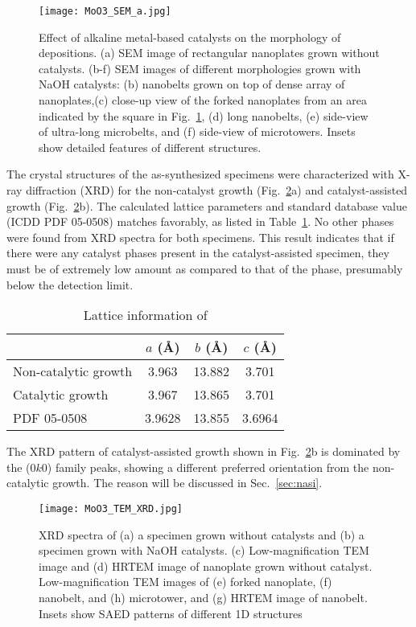 \begin{figure}[htb]
\centering
\texttt{[image: MoO3\_SEM\_a.jpg]}
\caption[SEM imaging on  catalytic growth]{Effect of alkaline metal-based catalysts on the morphology of  depositions. (a) SEM image of rectangular nanoplates grown without catalysts. (b-f) SEM images of different morphologies grown with NaOH catalysts: (b) nanobelts grown on top of dense array of nanoplates,(c) close-up view of the forked nanoplates from an area indicated by the square in Fig.~\ref{fig:ch4sem2by3}, (d) long nanobelts, (e) side-view of ultra-long microbelts, and (f) side-view of microtowers. Insets show detailed features of different  structures.}
\label{fig:ch4sem2by3}
\end{figure}

The crystal structures of the as-synthesized specimens were characterized with X-ray diffraction (XRD) for the non-catalyst growth (Fig.~\ref{fig:ch4tem3by3}a) and catalyst-assisted growth (Fig.~\ref{fig:ch4tem3by3}b). The calculated lattice parameters and standard database value (ICDD PDF 05-0508) matches favorably, as listed in Table~\ref{tab:ch4xrd}. No other phases were found from XRD spectra for both specimens. This result indicates that if there were any catalyst phases present in the catalyst-assisted specimen, they must be of extremely low amount as compared to that of the  phase, presumably below the detection limit. 
\begin{table}[htb]
\centering
\caption{Lattice information of }\label{tab:ch4xrd}
\begin{tabular}{lccc}
\toprule
           & $a$ (\AA) & $b$ (\AA) & $c$ (\AA)   \\
\midrule
Non-catalytic growth  & 3.963    & 13.882 & 3.701  \\
Catalytic growth  & 3.967    & 13.865 & 3.701  \\
PDF 05-0508       & 3.9628    & 13.855 & 3.6964  \\
\bottomrule
\end{tabular}
\end{table}

The XRD pattern of catalyst-assisted growth shown in Fig.~\ref{fig:ch4tem3by3}b is dominated by the (0$k$0) family peaks, showing a different preferred orientation from the non-catalytic growth. The reason will be discussed in Sec.~\ref{sec:nasi}. 

\begin{figure}[htb]
\centering
\texttt{[image: MoO3\_TEM\_XRD.jpg]}
\caption[XRD and TEM on  catalytic growth]{XRD spectra of (a) a specimen grown without catalysts and (b) a specimen grown with NaOH catalysts. (c) Low-magnification TEM image and (d) HRTEM image of nanoplate grown without catalyst. Low-magnification TEM images of (e) forked nanoplate, (f) nanobelt, and (h) microtower, and (g) HRTEM image of nanobelt. Insets show SAED patterns of different  1D structures}
\label{fig:ch4tem3by3}
\end{figure}

